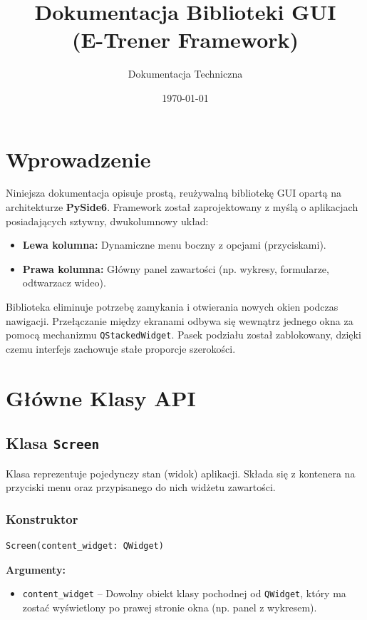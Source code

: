 \documentclass[a4paper,12pt]{article}
\title{Dokumentacja Biblioteki GUI\\ (E-Trener Framework)}
\author{Dokumentacja Techniczna}
\date{\today}
\begin{document}
\maketitle
\tableofcontents
\newpage

\section{Wprowadzenie}
Niniejsza dokumentacja opisuje prostą, reużywalną bibliotekę GUI opartą na architekturze \textbf{PySide6}. Framework został zaprojektowany z myślą o aplikacjach posiadających sztywny, dwukolumnowy układ:
\begin{itemize}
    \item \textbf{Lewa kolumna:} Dynamiczne menu boczny z opcjami (przyciskami).
    \item \textbf{Prawa kolumna:} Główny panel zawartości (np. wykresy, formularze, odtwarzacz wideo).
\end{itemize}

Biblioteka eliminuje potrzebę zamykania i otwierania nowych okien podczas nawigacji. Przełączanie między ekranami odbywa się wewnątrz jednego okna za pomocą mechanizmu \texttt{QStackedWidget}. Pasek podziału został zablokowany, dzięki czemu interfejs zachowuje stałe proporcje szerokości.

\section{Główne Klasy API}

\subsection{Klasa \texttt{Screen}}
Klasa reprezentuje pojedynczy stan (widok) aplikacji. Składa się z kontenera na przyciski menu oraz przypisanego do nich widżetu zawartości.

\subsubsection*{Konstruktor}
\begin{lstlisting}[language=Python]
Screen(content_widget: QWidget)
\end{lstlisting}
\textbf{Argumenty:}
\begin{itemize}
    \item \texttt{content_widget} -- Dowolny obiekt klasy pochodnej od \texttt{QWidget}, który ma zostać wyświetlony po prawej stronie okna (np. panel z wykresem).
\end{itemize}
\end{document}

